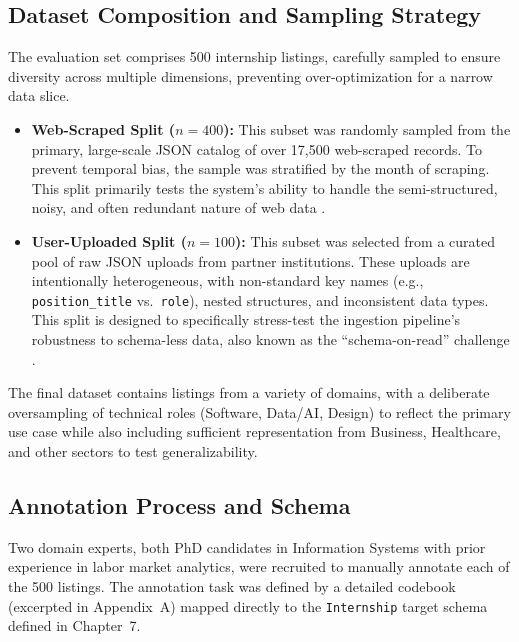 \subsection{Dataset Composition and Sampling Strategy}
The evaluation set comprises 500 internship listings, carefully sampled to ensure diversity across multiple dimensions, preventing over-optimization for a narrow data slice.
\begin{itemize}
    \item \textbf{Web-Scraped Split (\(n=400\)):} This subset was randomly sampled from the primary, large-scale JSON catalog of over 17,500 web-scraped records. To prevent temporal bias, the sample was stratified by the month of scraping. This split primarily tests the system's ability to handle the semi-structured, noisy, and often redundant nature of web data \cite{kurekova2015using}.
    \item \textbf{User-Uploaded Split (\(n=100\)):} This subset was selected from a curated pool of raw JSON uploads from partner institutions. These uploads are intentionally heterogeneous, with non-standard key names (e.g., \texttt{position\_title} vs.\ \texttt{role}), nested structures, and inconsistent data types. This split is designed to specifically stress-test the ingestion pipeline's robustness to schema-less data, also known as the ``schema-on-read'' challenge \cite{abiteboul1997querying, doan2012principles}.
\end{itemize}
The final dataset contains listings from a variety of domains, with a deliberate oversampling of technical roles (Software, Data/AI, Design) to reflect the primary use case while also including sufficient representation from Business, Healthcare, and other sectors to test generalizability.

\subsection{Annotation Process and Schema}
Two domain experts, both PhD candidates in Information Systems with prior experience in labor market analytics, were recruited to manually annotate each of the 500 listings. The annotation task was defined by a detailed codebook (excerpted in Appendix~A) mapped directly to the \texttt{Internship} target schema defined in Chapter~7.

